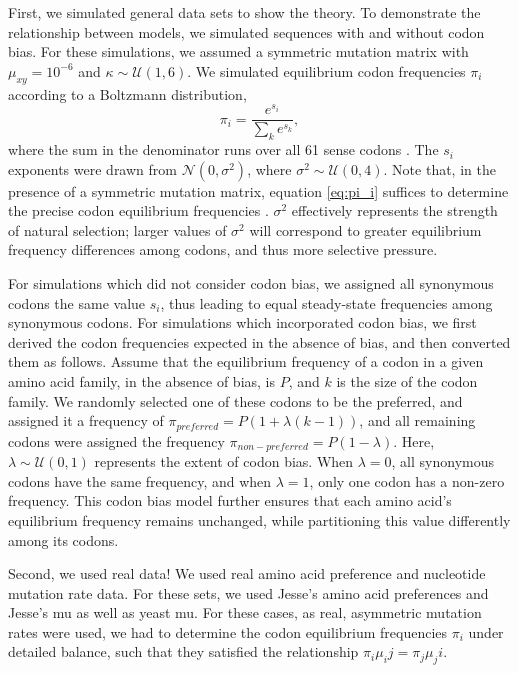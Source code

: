 \documentclass[11pt]{article}
\begin{document}
First, we simulated general data sets to show the theory.
To demonstrate the relationship between models, we simulated sequences with and without codon bias. For these simulations, we assumed a symmetric mutation matrix with $\mu_{xy} = 10^{-6}$ and $\kappa \sim \mathcal{U} (1,6)$. We simulated equilibrium codon frequencies $\pi_i$ according to a Boltzmann distribution, 
 \begin{equation}\label{eq:pi_i}
 \pi_i=\frac{e^{s_i}}{\sum_k e^{s_k}} ,
\end{equation} where the sum in the denominator runs over all 61 sense codons \cite{SellaHirsh2005}. The $s_i$ exponents were drawn from  $\mathcal{N}(0,\sigma^2)$, where $\sigma^2 \sim \mathcal{U}(0,4)$. Note that, in the presence of a symmetric mutation matrix, equation \eqref{eq:pi_i} suffices to determine the precise codon equilibrium frequencies \cite{SellaHirsh2005}. $\sigma^2$ effectively represents the strength of natural selection; larger values of $\sigma^2$ will correspond to greater equilibrium frequency differences among codons, and thus more selective pressure. 

For simulations which did not consider codon bias, we assigned all synonymous codons the same value $s_i$, thus leading to equal steady-state frequencies among synonymous codons. For simulations which incorporated codon bias, we first derived the codon frequencies expected in the absence of bias, and then converted them as follows. Assume that the equilibrium frequency of a codon in a given amino acid family, in the absence of bias, is $P$, and $k$ is the size of the codon family. We randomly selected one of these codons to be the preferred, and assigned it a frequency of $\pi_{preferred} = P(1 + \lambda(k-1))$, and all remaining codons were assigned the frequency $\pi_{non-preferred} = P(1 - \lambda)$. Here, $\lambda \sim \mathcal{U}(0,1)$ represents the extent of codon bias. When $\lambda = 0$, all synonymous codons have the same frequency, and when $\lambda = 1$, only one codon has a non-zero frequency. This codon bias model further ensures that each amino acid's equilibrium frequency remains unchanged, while partitioning this value differently among its codons.


Second, we used real data! We used real amino acid preference and nucleotide mutation rate data. For these sets, we used Jesse's amino acid preferences and Jesse's mu as well as yeast mu. For these cases, as real, asymmetric mutation rates were used, we had to determine the codon equilibrium frequencies $\pi_i$ under detailed balance, such that they satisfied the relationship $\pi_i\mu_ij = \pi_j\mu_ji$. 
\end{document}
